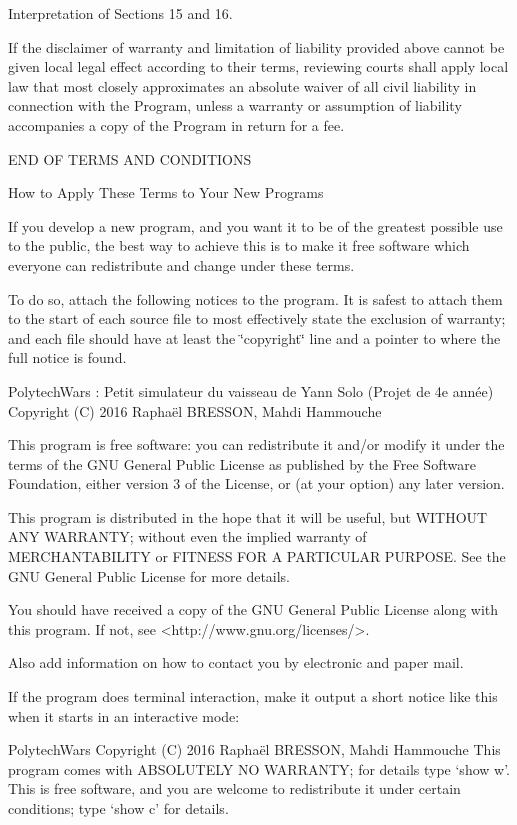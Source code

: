 \begin{DoxyEnumerate}
\item Interpretation of Sections 15 and 16.
\end{DoxyEnumerate}

If the disclaimer of warranty and limitation of liability provided above cannot be given local legal effect according to their terms, reviewing courts shall apply local law that most closely approximates an absolute waiver of all civil liability in connection with the Program, unless a warranty or assumption of liability accompanies a copy of the Program in return for a fee. \begin{DoxyVerb}                 END OF TERMS AND CONDITIONS

        How to Apply These Terms to Your New Programs
\end{DoxyVerb}


If you develop a new program, and you want it to be of the greatest possible use to the public, the best way to achieve this is to make it free software which everyone can redistribute and change under these terms.

To do so, attach the following notices to the program. It is safest to attach them to the start of each source file to most effectively state the exclusion of warranty; and each file should have at least the \char`\"{}copyright\char`\"{} line and a pointer to where the full notice is found. \begin{DoxyVerb}PolytechWars : Petit simulateur du vaisseau de Yann Solo (Projet de 4e année)
Copyright (C) 2016  Raphaël BRESSON, Mahdi Hammouche

This program is free software: you can redistribute it and/or modify
it under the terms of the GNU General Public License as published by
the Free Software Foundation, either version 3 of the License, or
(at your option) any later version.

This program is distributed in the hope that it will be useful,
but WITHOUT ANY WARRANTY; without even the implied warranty of
MERCHANTABILITY or FITNESS FOR A PARTICULAR PURPOSE.  See the
GNU General Public License for more details.

You should have received a copy of the GNU General Public License
along with this program.  If not, see <http://www.gnu.org/licenses/>.
\end{DoxyVerb}


Also add information on how to contact you by electronic and paper mail.

If the program does terminal interaction, make it output a short notice like this when it starts in an interactive mode\+: \begin{DoxyVerb}PolytechWars Copyright (C) 2016 Raphaël BRESSON, Mahdi Hammouche
This program comes with ABSOLUTELY NO WARRANTY; for details type `show w'.
This is free software, and you are welcome to redistribute it
under certain conditions; type `show c' for details.
\end{DoxyVerb}


